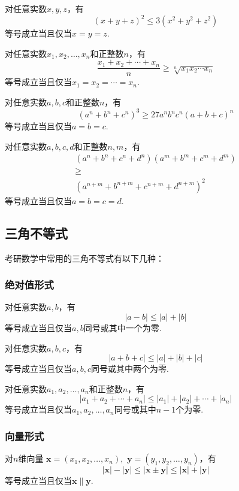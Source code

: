 对任意实数$x,y,z$，有
\begin{equation}
	(x+y+z)^2 \leq 3(x^2+y^2+z^2)
\end{equation}
等号成立当且仅当$x=y=z$.

对任意实数$x_1,x_2,\dots,x_n$和正整数$n$，有
\begin{equation}
	\dfrac{x_1+x_2+\cdots+x_n}{n} \geq \sqrt[n]{x_1x_2\cdots x_n}
\end{equation}
等号成立当且仅当$x_1=x_2=\cdots=x_n$.

对任意实数$a,b,c$和正整数$n$，有
\begin{equation}
	(a^n+b^n+c^n)^3 \geq 27a^nb^nc^n(a+b+c)^n
\end{equation}
等号成立当且仅当$a=b=c$.

对任意实数$a,b,c,d$和正整数$n,m$，有
\begin{equation}
	\begin{array}{c}
		(a^n+b^n+c^n+d^n)(a^m+b^m+c^m+d^m)\\ \geq \\(a^{n+m}+b^{n+m}+c^{n+m}+d^{n+m})^2
	\end{array}
\end{equation}
等号成立当且仅当$a=b=c=d$.

\subsection{三角不等式}
考研数学中常用的三角不等式有以下几种：

\subsubsection{绝对值形式}
对任意实数$a,b$，有
\begin{equation}
	|a-b| \leq |a|+|b|
\end{equation}
等号成立当且仅当$a,b$同号或其中一个为零.

对任意实数$a,b,c$，有
\begin{equation}
	|a+b+c| \leq |a|+|b|+|c|
\end{equation}
等号成立当且仅当$a,b,c$同号或其中两个为零.

对任意实数$a_1,a_2,\dots,a_n$和正整数$n$，有
\begin{equation}
	|a_1+a_2+\cdots+a_n| \leq |a_1|+|a_2|+\cdots+|a_n|
\end{equation}
等号成立当且仅当$a_1,a_2,\dots,a_n$同号或其中$n-1$个为零.

\subsubsection{向量形式}
对$n$维向量 
$\pmb{x}=(x_1,x_2,\dots,x_n),$
$\pmb{y}=(y_1,y_2,\dots,y_n)$，有
\begin{equation}
	|\pmb{x}|-|\pmb{y}|\leqslant |\pmb{x}\pm\pmb{y}|\leqslant |\pmb{x}|+|\pmb{y}|
\end{equation}
等号成立当且仅当$\pmb{x}\parallel\pmb{y}$.

